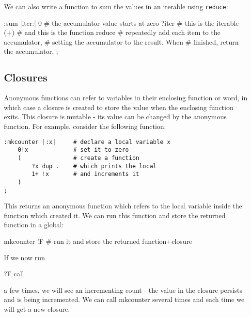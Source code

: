 We can also write a function to sum the values in an iterable using
\texttt{reduce}:
\begin{v}
:sum |iter:|
    0           # the accumulator value starts at zero
    ?iter       # this is the iterable
    (+)         # and this is the function 
    reduce      # repeatedly add each item to the accumulator,
                # setting the accumulator to the result. When
                # finished, return the accumulator.
;
\end{v}



\subsection{Closures}
Anonymous functions can refer to variables in their enclosing function or
word, in which case a closure is created to store the value when the enclosing
function exits. This closure is mutable - its value can be changed by the
anonymous function. For example, consider the following function:

\begin{lstlisting}
:mkcounter |:x|     # declare a local variable x
    0!x             # set it to zero
    (               # create a function
        ?x dup .    # which prints the local
        1+ !x       # and increments it
    )
;
\end{lstlisting}
This returns an anonymous function which refers to the local variable
inside the function which created it. We can run this function
and store the returned function in a global:

\begin{v}
mkcounter !F    # run it and store the returned function+closure
\end{v}
If we now run
\begin{v}
    ?F call
\end{v}
a few times, we will see an incrementing count - the value in the closure
persists and is being incremented. We can call mkcounter several times and
each time we will get a new closure.

